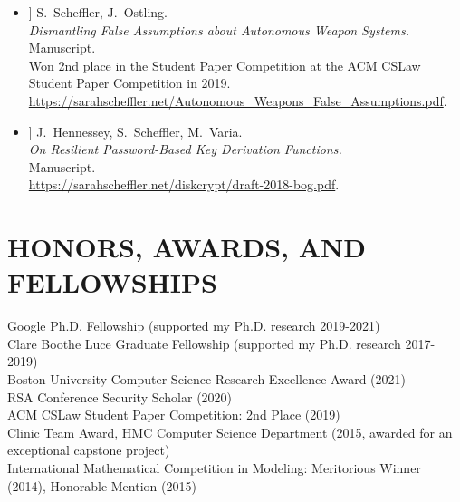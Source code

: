 \documentclass{res}
\begin{document}
\begin{resume}
\newcommand{\autonomousWeapons}{[15]\xspace}
\newcommand{\bog}{[16]\xspace}

\begin{itemize}
\item[\autonomousWeapons] S.~Scheffler, J.~Ostling. \\
\emph{Dismantling False Assumptions about Autonomous Weapon Systems.} \\
Manuscript.  \\
Won 2nd place in the Student Paper Competition at the ACM CSLaw Student Paper Competition in 2019. \\
\url{https://sarahscheffler.net/Autonomous_Weapons_False_Assumptions.pdf}.

\item[\bog] J.~Hennessey, S.~Scheffler, M.~Varia. \\
\emph{On Resilient Password-Based Key Derivation Functions.} \\
Manuscript.  \\
\url{https://sarahscheffler.net/diskcrypt/draft-2018-bog.pdf}.
\end{itemize}

\vspace{0.25in}

\section{HONORS, AWARDS, AND FELLOWSHIPS}
\vspace{0.1in}
    Google Ph.D. Fellowship (supported my Ph.D. research 2019-2021) \\
    Clare Boothe Luce Graduate Fellowship (supported my Ph.D. research 2017-2019) \\
    Boston University Computer Science Research Excellence Award (2021) \\
    RSA Conference Security Scholar (2020) \\
    ACM CSLaw Student Paper Competition: 2nd Place (2019) \\
    Clinic Team Award, HMC Computer Science Department (2015, awarded for an exceptional capstone project) \\
    International Mathematical Competition in Modeling: Meritorious Winner (2014), Honorable Mention (2015) \\       


\end{resume}
\end{document}
